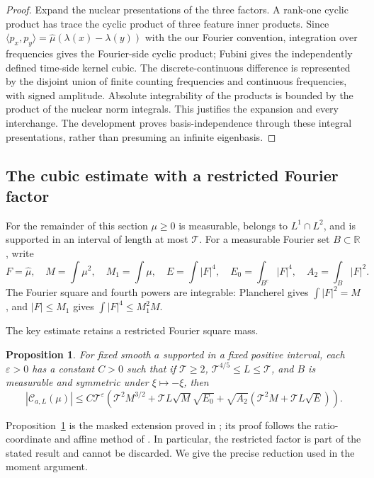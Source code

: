 \documentclass[11pt,a4paper,oneside]{article}
\newtheorem{proposition}[theorem]{Proposition}
\theoremstyle{definition}
\newcommand{\R}{\mathbb R}
\newcommand{\eps}{\varepsilon}
\newcommand{\Hhat}{\widehat}
\numberwithin{equation}{section}
\begin{document}
\begin{proof}
Expand the nuclear presentations of the three factors. A rank-one cyclic
product has trace the cyclic product of three feature inner products.
Since $\langle p_x,p_y\rangle=\Hhat\mu(\lambda(x)-\lambda(y))$ with the
our Fourier convention, integration over frequencies gives the Fourier-side
cyclic product; Fubini gives the independently defined time-side kernel
cubic. The discrete-continuous difference is represented by the disjoint
union of finite counting frequencies and continuous frequencies, with signed
amplitude. Absolute integrability of the products is bounded by the product
of the nuclear norm integrals. This justifies the expansion and every
interchange. The development proves basis-independence through these integral
presentations, rather than presuming an infinite eigenbasis.
\end{proof}
\subsection{The cubic estimate with a restricted Fourier factor}
For the remainder of this section $\mu\ge0$ is measurable, belongs to
$L^1\cap L^2$, and is supported in an interval of length at most $\mathcal T$.
For a measurable Fourier set $B\subset\R$, write
\[
 F=\Hhat\mu,\quad M=\int\mu^2,\quad M_1=\int\mu,\quad
 E=\int|F|^4,\quad E_0=\int_{B^c}|F|^4,\quad A_2=\int_B|F|^2.
\]
The Fourier square and fourth powers are integrable: Plancherel gives
$\int|F|^2=M$, and $|F|\le M_1$ gives
$\int|F|^4\le M_1^2M$.

The key estimate retains a restricted Fourier square mass.
\begin{proposition}\label{input:maskedcubic}
For fixed smooth $a$ supported in a fixed positive interval, each $\eps>0$
has a constant $C>0$ such that if
$\mathcal T\ge2$, $\mathcal T^{4/5}\le L\le\mathcal T$, and $B$ is
measurable and symmetric under $\xi\mapsto-\xi$, then
\begin{equation}\label{eq:maskedcubic}
 |\mathcal C_{a,L}(\mu)|\le C\mathcal T^\eps
 \left(\mathcal T^2M^{3/2}+\mathcal TL\sqrt M\sqrt{E_0}
    +\sqrt{A_2}(\mathcal T^2M+\mathcal TL\sqrt E)\right).
\end{equation}

\end{proposition}
Proposition~\ref{input:maskedcubic} is the masked extension proved in \cite{Lewko}; its proof follows the ratio-coordinate and affine method of \cite[Sections~7--9]{GuthMaynard}. In particular, the restricted factor is part of the stated result and cannot be discarded. We give the precise reduction used in the moment argument.
\end{document}
